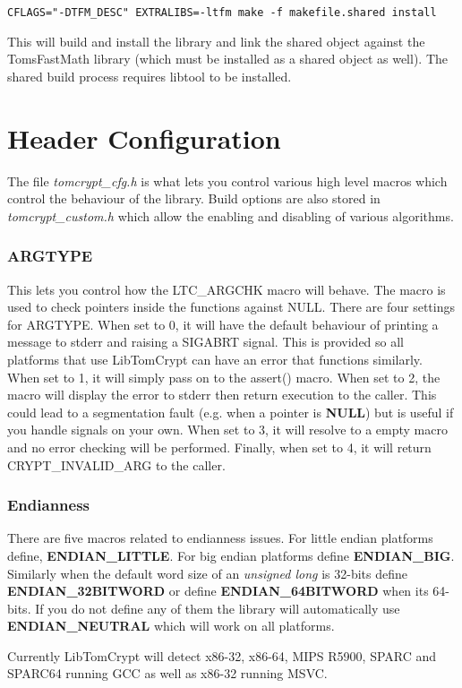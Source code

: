 \documentclass[synpaper]{book}
\newcommand{\mysection}[1]    %
	{                   %
	\section{#1}
   \markboth{\textsf{www.libtom.org}}{\thesection ~ {#1}}
	}
\begin{document}
\begin{verbatim}
CFLAGS="-DTFM_DESC" EXTRALIBS=-ltfm make -f makefile.shared install
\end{verbatim}

This will build and install the library and link the shared object against the TomsFastMath library (which must be installed as a shared object as well).  The
shared build process requires libtool to be installed.

\mysection{Header Configuration}
The file \textit{tomcrypt\_cfg.h} is what lets you control various high level macros which control the behaviour of the library.  Build options are also
stored in \textit{tomcrypt\_custom.h} which allow the enabling and disabling of various algorithms.

\subsubsection{ARGTYPE}
This lets you control how the LTC\_ARGCHK macro will behave.  The macro is used to check pointers inside the functions against
NULL.  There are four settings for ARGTYPE.  When set to 0, it will have the default behaviour of printing a message to
stderr and raising a SIGABRT signal.  This is provided so all platforms that use LibTomCrypt can have an error that functions
similarly.  When set to 1, it will simply pass on to the assert() macro.  When set to 2, the macro will display the error to
stderr then return execution to the caller.  This could lead to a segmentation fault (e.g. when a pointer is \textbf{NULL}) but is useful
if you handle signals on your own.  When set to 3, it will resolve to a empty macro and no error checking will be performed.  Finally, when set
to 4, it will return CRYPT\_INVALID\_ARG to the caller.

\subsubsection{Endianness}
There are five macros related to endianness issues.  For little endian platforms define, \textbf{ENDIAN\_LITTLE}.  For big endian
platforms define \textbf{ENDIAN\_BIG}.  Similarly when the default word size of an \textit{unsigned long} is 32-bits define \textbf{ENDIAN\_32BITWORD}
or define \textbf{ENDIAN\_64BITWORD} when its 64-bits.  If you do not define any of them the library will automatically use \textbf{ENDIAN\_NEUTRAL}
which will work on all platforms.

Currently LibTomCrypt will detect x86-32, x86-64, MIPS R5900, SPARC and SPARC64 running GCC as well as x86-32 running MSVC.
\end{document}
